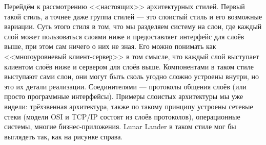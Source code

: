 \documentclass[a5paper]{article}
\newlength\Colsep
\begin{document}
\noindent\begin{minipage}{\textwidth}
    \begin{minipage}[c][10cm][c]{\dimexpr0.8\textwidth-0.5\Colsep\relax}
        Перейдём к рассмотрению <<настоящих>> архитектурных стилей. Первый такой стиль, а точнее даже группа стилей --- это слоистый стиль и его возможные вариации. Суть этого стиля в том, что мы разделяем систему на слои, где каждый слой может пользоваться слоями ниже и предоставляет интерфейс для слоёв выше, при этом сам ничего о них не зная. Его можно понимать как <<многоуровневый клиент-сервер>> в том смысле, что каждый слой выступает клиентом слоёв ниже и сервером для слоёв выше. Компонентами в таком стиле выступают сами слои, они могут быть сколь угодно сложно устроены внутри, но это их детали реализации. Соединителями --- протоколы общения слоёв (или просто программные интерфейсы). Примеры слоистых архитектуры мы уже видели: трёхзвенная архитектура, также по такому принципу устроены сетевые стеки (модели OSI и TCP/IP состоят из слоёв протоколов), операционные системы, многие бизнес-приложения. Lunar Lander в таком стиле мог бы выглядеть так, как на рисунке справа.

        \vspace{3mm}


\end{minipage}
\end{minipage}
\end{document}
